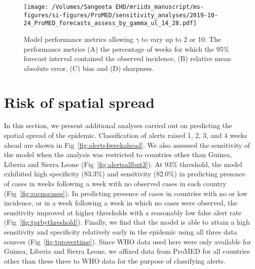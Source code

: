 \documentclass[9pt,twoside,lineno]{pnas-new}
\begin{document}
\begin{figure}
    \centering
    \texttt{[image: /Volumes/Sangeeta EHD/mriids\_manuscript/ms-figures/si-figures/ProMED/sensitivity\_analyses/2019-10-24\_ProMED\_forecasts\_assess\_by\_gamma\_ul\_14\_28.pdf]} 
  \caption{Model performance metrics allowing $\gamma$ to vary up to
    2 or 10. The performance metrics (A) the percentage of weeks for
    which the 95\% forecast interval contained the observed incidence,
    (B) relative mean absolute error, (C) bias and (D) sharpness.}\label{fig:perfbygamma}
\end{figure}\FloatBarrier

\section{Risk of spatial spread}\label{sec:spatial-spread}

In this section, we present additional analyses carried out on
predicting the spatial spread of the epidemic. Classification of
alerts raised 1, 2, 3, and 4 weeks ahead are shown in
Fig~\ref{fig:alerts4weekahead}. We also assessed the sensitivity
of the model when the analysis was restricted to countries other than
Guinea, Liberia and Sierra Leone (Fig~\ref{fig:alertsallbut3}). At
93\% threshold, the
model exhibited high specificity (83.3\%) and sensitivity (82.0\%) in predicting 
presence of cases in weeks following a week with no observed cases in each
country (Fig~\ref{fig:rocnocases}). In predicting presence of cases in
countries with no or low incidence, or in a
week following a week in which no cases were observed, the sensitivity
improved at higher thresholds with a reasonably low false alert rate
(Fig~\ref{fig:tprbythreshold}). Finally, we find that the model is
able to attain a high sensitivity and specificity relatively early in 
the epidemic using all three data sources (Fig~\ref{fig:tprovertime}).
Since WHO data used here were only available for Guinea, Liberia and
Sierra Leone, we affixed data from ProMED for all countries other than
these three to WHO data for the purpose of classifying alerts.
 
\end{document}
